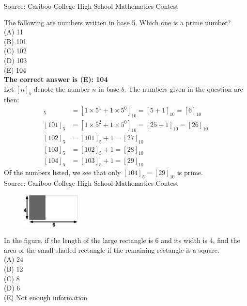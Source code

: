 \documentclass{article}
\begin{document}
\scriptsize
Source: Cariboo College High School Mathematics Contest

\normalsize
The following are numbers written in base 5. Which one is a prime number?\\
(A) 11\\
(B) 101\\
(C) 102\\
(D) 103\\
(E) 104\\

\textbf{The correct answer is (E): 104}\\
Let $[n]_{b}$ denote the number $n$ in base $b$. The numbers given in the question are then:
\begin{align*} 
[11]_{5} &=[1\times5^{1}+1\times5^{0}]_{10}=[5+1]_{10}=[6]_{10}\\
[101]_{5} &=[1\times5^{2}+1\times5^{0}]_{10}=[25+1]_{10}=[26]_{10}\\
[102]_{5} &=[101]_{5}+1=[27]_{10}\\
[103]_{5} &=[102]_{5}+1=[28]_{10}\\
[104]_{5} &=[103]_{5}+1=[29]_{10}
\end{align*}
Of the numbers listed, we see that only $[104]_{5}=[29]_{10}$ is prime.
\\[5 ex]

\scriptsize
Source: Cariboo College High School Mathematics Contest

\normalsize
\begin{figure}
	\includegraphics[width=30mm,viewport=17 290 402 516]{CCJPR73-7pic.eps}
\end{figure}
In the figure, if the length of the large rectangle is 6 and its width is 4, find the area of the small shaded rectangle if the remaining rectangle is a square.\\
(A) 24\\
(B) 12\\
(C) 8\\
(D) 6\\
(E) Not enough information\\
\end{document}

